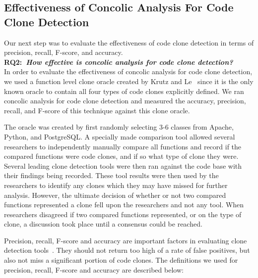 \documentclass{sig-alternate}
\newif\ifisnopii
\begin{document}
\subsection{Effectiveness of Concolic Analysis For Code Clone Detection}
\label{sec: acc_prec_rec}

Our next step was to evaluate the effectiveness of code clone detection in terms of precision, recall, F-score, and accuracy. \\  

\textbf{RQ2:~\emph{How effective is concolic analysis for code clone detection?}}\\
In order to evaluate the effectiveness of concolic analysis for code clone detection, we used a function level clone oracle created by Krutz and Le~\cite{Krutz:2014:CCO:2597073.2597127} since it is the only known oracle to contain all four types of code clones explicitly defined. We ran concolic analysis for code clone detection and measured the accuracy, precision, recall, and F-score of this technique against this clone oracle.

The oracle was created by first randomly selecting 3-6 classes from Apache, Python, and PostgreSQL. A specially made comparison tool allowed several researchers to independently manually compare all functions and record if the compared functions were code clones, and if so what type of clone they were. Several leading clone detection tools were then ran against the code base with their findings being recorded. These tool results were then used by the researchers to identify any clones which they may have missed for further analysis. However, the ultimate decision of whether or not two compared functions represented a clone fell upon the researchers and not any tool. When researchers disagreed if two compared functions represented, or on the type of clone, a discussion took place until a consensus could be reached. \ifisnopii While CCCD was one of the selected tools used as input for this oracle, since all clone decisions were manually verified and tools were never the deciding factor as to what constituted a clone, we do not feel like this negatively impacted the results. \else \fi

Precision, recall, F-score and accuracy are important factors in evaluating clone detection tools~\cite{Zibran:2012:IRF:2231936.2231970}. They should not return too high of a rate of false positives, but also not miss a significant portion of code clones. The definitions we used for precision, recall, F-score and accuracy are described below:
\end{document}
